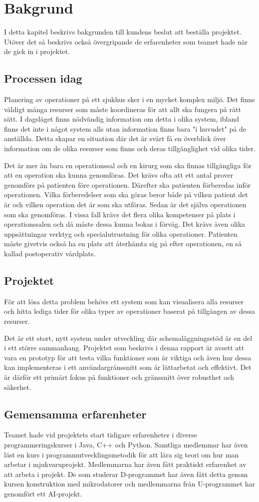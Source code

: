 \chapter{Bakgrund}
I detta kapitel beskrivs bakgrunden till kundens beslut att beställa projektet.
Utöver det så beskrivs också övergripande de erfarenheter som teamet hade när de gick
in i projektet.

\section{Processen idag}
Planering av operationer på ett sjukhus sker i en mycket komplex miljö. Det
finns väldigt många resurser som måste koordineras för att allt ska fungera på rätt sätt.
I dagsläget finns nödvändig information om detta i olika system, ibland finns
det inte i något system alls utan information finns bara "i huvudet" på de anställda. Detta
skapar en situation där det är svårt få en överblick över information om de olika
resurser som finns och deras tillgänglighet vid olika tider.

Det är mer än bara en operationssal och en kirurg som ska finnas tillgängliga
för att en operation ska kunna genomföras. Det krävs ofta att ett antal prover
genomförs på patienten före operationen. Därefter ska patienten
förberedas inför operationen. Vilka förberedelser som ska göras beror både på
vilken patient det är och vilken operation det är som ska utföras. Sedan är det
själva operationen som ska genomföras. I vissa fall krävs det flera olika
kompetenser på plats i operationssalen och då måste dessa kunna bokas i förväg.
Det krävs även olika uppsättningar verktyg och specialutrustning för olika
operationer.
Patienten måste givetvis också ha en plats att återhämta sig på efter
operationen, en så kallad postoperativ vårdplats.

\section{Projektet}
För att lösa detta problem behövs ett system som kan visualisera alla resurser
och hitta lediga tider för olika typer av operationer baserat på tillgången av
dessa resurser.

Det är ett stort, nytt system under utveckling där schemaläggningsstöd är en del
i ett större sammanhang. Projektet som beskrivs i denna rapport är avsett att vara
en prototyp för att testa vilka funktioner som är viktiga och även hur dessa
kan implementeras i ett användargränssnitt som är lättarbetat och effektivt.
Det är därför ett primärt fokus på funktioner och gränssnitt över robusthet och
säkerhet.

\section{Gemensamma erfarenheter}
Teamet hade vid projektets start tidigare erfarenheter i diverse programmeringskurser i Java, C++ och Python. 
Samtliga medlemmar har även läst en kurs i programmutvecklingsmetodik för att lära sig teori om hur man arbetar i mjukvaruprojekt. 
Medlemmarna har även fått praktiskt erfarenhet av att arbeta i projekt. De som studerar D-programmet har även fått detta genom kursen konstruktion med mikrodatorer och medlemmarna från U-programmet har genomfört ett AI-projekt.
